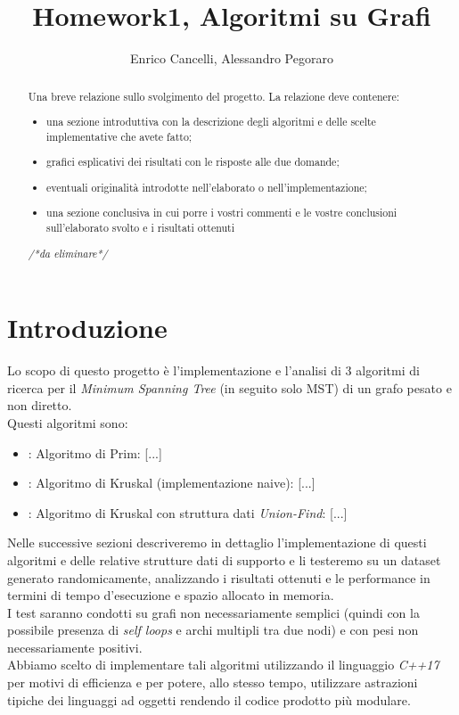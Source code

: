 \documentclass[]{article}
\title{Homework1, Algoritmi su Grafi}
\author{Enrico Cancelli, Alessandro Pegoraro}
\begin{document}
\maketitle

\begin{abstract}
	Una breve relazione sullo svolgimento del progetto. La relazione deve contenere:
	\begin{itemize}
		\item una sezione introduttiva con la descrizione degli algoritmi e delle scelte implementative che avete fatto;
		\item grafici esplicativi dei risultati con le risposte alle due domande;
		\item eventuali originalità introdotte nell'elaborato o nell'implementazione;
		\item una sezione conclusiva in cui porre i vostri commenti e le vostre conclusioni sull'elaborato svolto e i risultati ottenuti
	\end{itemize}
	\textit{/*da eliminare*/}
\end{abstract}

\section{Introduzione}
Lo scopo di questo progetto è l'implementazione e l'analisi di 3 algoritmi di ricerca per il \textit{Minimum Spanning Tree} (in seguito solo MST) di un grafo pesato e non diretto.\\
Questi algoritmi sono:
\begin{itemize}
	\item: Algoritmo di Prim: [...] 
	\item: Algoritmo di Kruskal (implementazione naive): [...]
	\item: Algoritmo di Kruskal con struttura dati \textit{Union-Find}: [...]
\end{itemize}
Nelle successive sezioni descriveremo in dettaglio l'implementazione di questi algoritmi e delle relative strutture dati di supporto e li testeremo su un dataset generato randomicamente, analizzando i risultati ottenuti e le performance in termini di tempo d'esecuzione e spazio allocato in memoria.\\
I test saranno condotti su grafi non necessariamente semplici (quindi con la possibile presenza di \textit{self loops} e archi multipli tra due nodi) e con pesi non necessariamente positivi.\\
Abbiamo scelto di implementare tali algoritmi utilizzando il linguaggio \textit{C++17} per motivi di efficienza e per potere, allo stesso tempo, utilizzare astrazioni tipiche dei linguaggi ad oggetti rendendo il codice prodotto più modulare.
\end{document}

